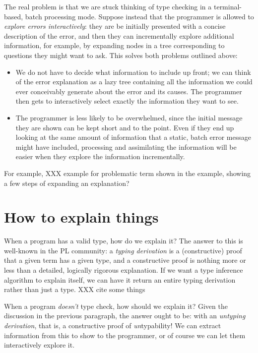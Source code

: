 \documentclass[sigplan, screen]{acmart}\settopmatter{printccs=false,printacmref=false}
\begin{document}
The real problem is that we are stuck thinking of type checking in a
terminal-based, batch processing mode.  Suppose instead that the
programmer is allowed to \emph{explore errors interactively}: they are
be initially presented with a concise description of the error, and
then they can incrementally explore additional information, for
example, by expanding nodes in a tree corresponding to questions they
might want to ask.  This solves both problems outlined above:
\begin{itemize}
\item We do not have to decide what information to include up front;
  we can think of the error explanation as a lazy tree containing all
  the information we could ever conceivably generate about the error
  and its causes.  The programmer then gets to interactively select
  exactly the information they want to see.
\item The programmer is less likely to be overwhelmed, since the
  initial message they are shown can be kept short and to the point.
  Even if they end up looking at the same amount of information that a
  static, batch error message might have included, processing and
  assimilating the information will be easier when they explore the
  information incrementally.
\end{itemize}

For example, XXX example for problematic term shown in the example,
showing a few steps of expanding an explanation?

\section{How to explain things}

When a program has a valid type, how do we explain it?  The answer to
this is well-known in the PL community: a \emph{typing derivation} is
a (constructive) proof that a given term has a given type, and a
constructive proof is nothing more or less than a detailed, logically
rigorous explanation.  If we want a type inference algorithm to
explain itself, we can have it return an entire typing derivation
rather than just a type.   XXX cite some things

When a program \emph{doesn't} type check, how should we explain it?
Given the discussion in the previous paragraph, the answer ought to
be: with an \emph{untyping derivation}, that is, a constructive proof
of \emph{un}typability!  We can extract information from this to show to the
programmer, or of course we can let them interactively explore it.
\end{document}
